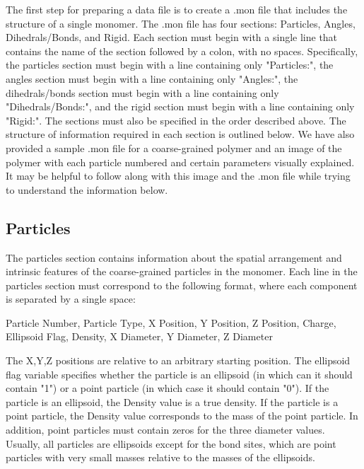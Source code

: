 \documentclass{article}
\begin{document}
The first step for preparing a data file is to create a .mon file that includes the structure of a single monomer. The .mon file has four sections: Particles, Angles, Dihedrals/Bonds, and Rigid. Each section must begin with a single line that contains the name of the section followed by a colon, with no spaces. Specifically, the particles section must begin with a line containing only "Particles:", the angles section must begin with a line containing only "Angles:", the dihedrals/bonds section must begin with a line containing only "Dihedrals/Bonds:", and the rigid section must begin with a line containing only "Rigid:". The sections must also be specified in the order described above. The structure of information required in each section is outlined below. We have also provided a sample .mon file for a coarse-grained polymer and an image of the polymer with each particle numbered and certain parameters visually explained. It may be helpful to follow along with this image and the .mon file while trying to understand the information below. 

\subsection{Particles}
The particles section contains information about the spatial arrangement and intrinsic features of the coarse-grained particles in the monomer. Each line in the particles section must correspond to the following format, where each component is separated by a single space:

Particle Number, Particle Type, X Position, Y Position, Z Position, Charge, Ellipsoid Flag, Density, X Diameter, Y Diameter, Z Diameter

The X,Y,Z positions are relative to an arbitrary starting position. The ellipsoid flag variable specifies whether the particle is an ellipsoid (in which can it should contain "1") or a point particle (in which case it should contain "0"). If the particle is an ellipsoid, the Density value is a true density. If the particle is a point particle, the Density value corresponds to the mass of the point particle. In addition, point particles must contain zeros for the three diameter values. Usually, all particles are ellipsoids except for the bond sites, which are point particles with very small masses relative to the masses of the ellipsoids. 
\end{document}
